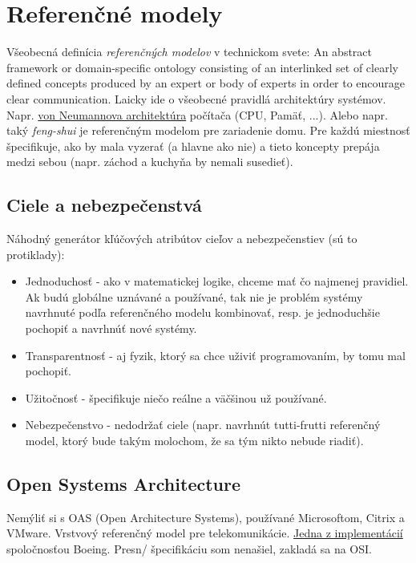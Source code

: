 \documentclass[10pt,a4paper]{article}
\begin{document}
\section{Referenčné modely}   
\label{reference_model}   
Všeobecná definícia \emph{referenčných modelov} v technickom svete: An abstract framework or domain-specific ontology consisting of an interlinked set of clearly defined concepts produced by an expert or body of experts in order to encourage clear communication. 
Laicky ide o všeobecné pravidlá architektúry systémov. Napr. \href{http://en.wikipedia.org/wiki/Von_Neumann_architecture}{von Neumannova architektúra} počítača (CPU, Pamäť, ...). Alebo napr. taký \emph{feng-shui} je referenčným modelom pre zariadenie domu. Pre každú miestnosť špecifikuje, ako by mala vyzerať (a hlavne ako nie) a tieto koncepty prepája medzi sebou (napr. záchod a kuchyňa by nemali susedieť). 
     
\subsection{Ciele a nebezpečenstvá}   
Náhodný generátor kľúčových atribútov cieľov a nebezpečenstiev (sú to protiklady):
\begin{itemize}
\item Jednoduchosť - ako v matematickej logike, chceme mať čo najmenej pravidiel. Ak budú globálne uznávané a používané, tak nie je problém systémy navrhnuté podľa referenčného modelu kombinovať, resp. je jednoduchšie pochopiť a navrhnúť nové systémy. 
\item Transparentnosť - aj fyzik, ktorý sa chce uživiť programovaním, by tomu mal pochopiť.
\item Užitočnosť - špecifikuje niečo reálne a väčšinou už používané.
\item Nebezpečenstvo - nedodržať ciele (napr. navrhnút tutti-frutti referenčný model, ktorý bude takým molochom, že sa tým nikto nebude riadiť). 
\end{itemize}

\subsection{Open Systems Architecture} 
Nemýliť si s OAS (Open Architecture Systems), používané Microsoftom, Citrix a VMware. 
Vrstvový referenčný model pre telekomunikácie. \href{www.acq.osd.mil/osjtf/pdf/boeing.pdf}{Jedna z implementácií} spoločnosťou Boeing. 
Presn/ špecifikáciu som nenašiel, zakladá sa na OSI. 
\end{document}
